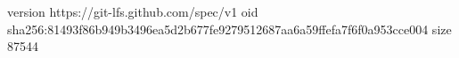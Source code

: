 version https://git-lfs.github.com/spec/v1
oid sha256:81493f86b949b3496ea5d2b677fe9279512687aa6a59ffefa7f6f0a953cce004
size 87544
